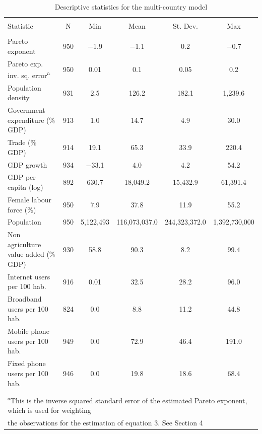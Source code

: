 \documentclass[10pt,letterpaper]{article}
\begin{document}
\begin{table}[!htbp] \centering 
  \caption{Descriptive statistics for the multi-country model\label{desc.global}} 
  \label{} 
\footnotesize 
\begin{tabular}{@{\extracolsep{1pt}}lccccc} 
\\[-1.8ex]\hline 
\hline \\[-1.8ex] 
Statistic & \multicolumn{1}{c}{N} & \multicolumn{1}{c}{Min} & \multicolumn{1}{c}{Mean} & \multicolumn{1}{c}{St. Dev.} & \multicolumn{1}{c}{Max} \\ 
\hline \\[-1.8ex] 
Pareto exponent & 950 & $-$1.9 & $-$1.1 & 0.2 & $-$0.7 \\ 
Pareto exp. inv. sq. error\textsuperscript{a} & 950 & 0.01 & 0.1 & 0.05 & 0.2 \\ 
Population density & 931 & 2.5 & 126.2 & 182.1 & 1,239.6 \\ 
Government expenditure (\% GDP) & 913 & 1.0 & 14.7 & 4.9 & 30.0 \\ 
Trade (\% GDP) & 914 & 19.1 & 65.3 & 33.9 & 220.4 \\ 
GDP growth & 934 & $-$33.1 & 4.0 & 4.2 & 54.2 \\ 
GDP per capita (log) & 892 & 630.7 & 18,049.2 & 15,432.9 & 61,391.4 \\ 
Female labour force (\%) & 950 & 7.9 & 37.8 & 11.9 & 55.2 \\ 
Population & 950 & 5,122,493 & 116,073,037.0 & 244,323,372.0 & 1,392,730,000 \\ 
Non agriculture value added (\% GDP) & 930 & 58.8 & 90.3 & 8.2 & 99.4 \\ 
Internet users per 100 hab. & 916 & 0.01 & 32.5 & 28.2 & 96.0 \\ 
Broadband users per 100 hab. & 824 & 0.0 & 8.8 & 11.2 & 44.8 \\ 
Mobile phone users per 100 hab. & 949 & 0.0 & 72.9 & 46.4 & 191.0 \\ 
Fixed phone users per 100 hab. & 946 & 0.0 & 19.8 & 18.6 & 68.4 \\ 
\hline \\[-1.8ex] 
\multicolumn{6}{l}{\textsuperscript{a}This is the inverse squared standard error of the estimated Pareto exponent, which is used for weighting} \\ 
\multicolumn{6}{l}{the observations for the estimation of equation 3. See Section 4} \\ 
\end{tabular} 
\end{table}
\end{document}
